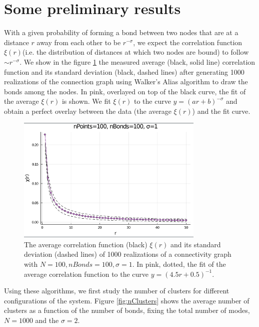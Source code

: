 \section{Some preliminary results}

With a given probability of forming a bond between two nodes that are at a distance $r$ away from each other to be $r^{-\sigma}$, we expect the correlation function $\xi(r)$(i.e. the distribution of distances at which two nodes are bound) to follow $\sim r^{-\sigma}$. We show in the figure \ref{fig:correlationFunction} the measured average (black, solid line) correlation function and its standard deviation (black, dashed lines) after generating 1000 realizations of the connection graph using Walker's Alias algorithm to draw the bonds among the nodes. In pink, overlayed on top of the black curve, the fit of the average $\xi(r)$ is shown. We fit $\xi(r)$ to the curve $y = (a r + b) ^{-\sigma}$ and obtain a perfect overlay between the data (the average $\xi(r)$) and the fit curve.

\begin{figure}[h]
	\centering
	\includegraphics[width=0.8\textwidth]{figures/correlationFunction.png}
	\caption{The average correlation function (black) $\xi(r)$ and its standard deviation (dashed lines) of  1000 realizations of a connectivity graph with $N=100, nBonds=100, \sigma=1$. In pink, dotted, the fit of the average correlation function to the curve $y = (4.5 r + 0.5) ^ {-1} $.} 
	\label{fig:correlationFunction}
\end{figure}

Using these algorithms, we first study the number of clusters for different configurations of the system.
Figure \ref{fig:nClusters} shows the average number of clusters as a function of the number of bonds, fixing the total number of modes, $N=1000$ and the $\sigma=2$.

